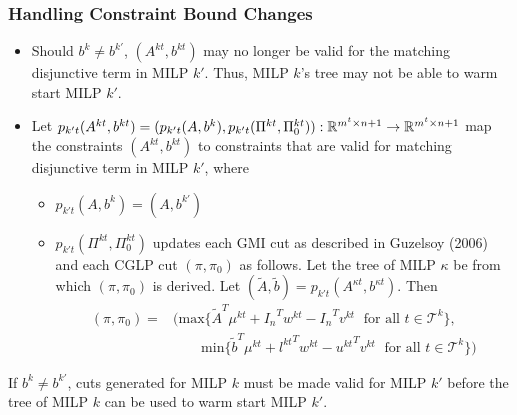 \documentclass{beamer}
\begin{document}
	\begin{frame}[t]
		\frametitle{Handling Constraint Bound Changes}
		\small
		\vspace{-.25cm}
		\begin{itemize}
			\item Should $ b^k \neq b^{k'} $, $ (A^{kt}, b^{kt}) $ may no longer be valid for the matching disjunctive term in MILP $ k' $. Thus, MILP $ k $'s tree may not be able to warm start MILP $ k' $.
			
			\item Let $ p_{k't}(A^{kt}, b^{kt}) = (p_{k't}(A, b^k), p_{k't}(\Pi^{kt}, \Pi_0^{kt})) : \mathbb{R}^{m^t \times n + 1} \rightarrow \mathbb{R}^{m^t \times n + 1} $ map the constraints $ (A^{kt}, b^{kt}) $ to constraints that are valid for matching disjunctive term in MILP $ k' $, where
			\begin{itemize}
				\item $ p_{k't}(A, b^k) = (A, b^{k'}) $
				\item $ p_{k't}(\Pi^{kt}, \Pi_0^{kt}) $ updates each GMI cut as described in Guzelsoy (2006) and each CGLP cut $ (\pi, \pi_0) $ as follows. Let the tree of MILP $ \kappa $ be from which $ (\pi, \pi_0) $ is derived. Let $ (\tilde{A}, \tilde{b}) = p_{k't}(A^{\kappa t}, b^{\kappa t}) $. Then
				\begin{align*}
					(\pi, \pi_0) =& (\text{max} \{\tilde{A}^T \mu^{kt} + {I_n}^T w^{kt} - {I_n}^T v^{kt} \; \text{ for all } t \in \mathcal{T}^k\}, \\
					& \qquad \text{min} \{\tilde{b}^T \mu^{kt} + {l^{kt}}^T w^{kt} - {u^{kt}}^T v^{kt} \; \text{ for all } t \in \mathcal{T}^k\})
				\end{align*}
			\end{itemize}
		\end{itemize}
		\vspace{-.25cm}
		\begin{block}{}
			If $ b^k \neq b^{k'} $, cuts generated for MILP $ k $ must be made valid for MILP $ k' $ before the tree of MILP $ k $ can be used to warm start MILP $ k' $.
		\end{block}
		\normalsize
	\end{frame}
\end{document}
